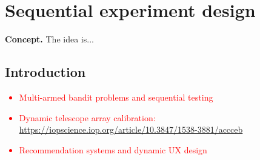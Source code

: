 \chapter{\sffamily Sequential experiment design}

{\bfseries\sffamily Concept.} The idea is...

\section{\sffamily Introduction}

\textcolor{red}{
\begin{itemize}
\item{Multi-armed bandit problems and sequential testing}
\item{Dynamic telescope array calibration: \url{https://iopscience.iop.org/article/10.3847/1538-3881/accceb}}
\item{Recommendation systems and dynamic UX design} 
\end{itemize}
}